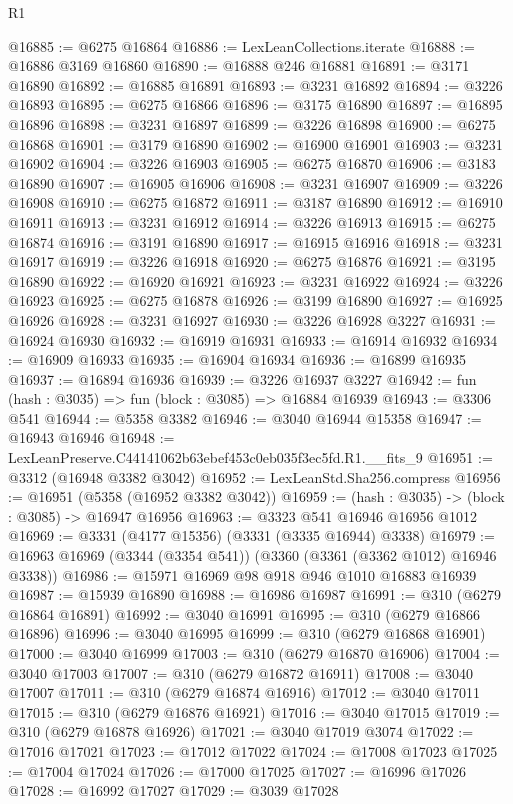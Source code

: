 \begin{lexlean}{R1}
\begin{coremodule}
@16885 := @6275 @16864
@16886 := LexLeanCollections.iterate
@16888 := @16886 @3169 @16860
@16890 := @16888 @246 @16881
@16891 := @3171 @16890
@16892 := @16885 @16891
@16893 := @3231 @16892
@16894 := @3226 @16893
@16895 := @6275 @16866
@16896 := @3175 @16890
@16897 := @16895 @16896
@16898 := @3231 @16897
@16899 := @3226 @16898
@16900 := @6275 @16868
@16901 := @3179 @16890
@16902 := @16900 @16901
@16903 := @3231 @16902
@16904 := @3226 @16903
@16905 := @6275 @16870
@16906 := @3183 @16890
@16907 := @16905 @16906
@16908 := @3231 @16907
@16909 := @3226 @16908
@16910 := @6275 @16872
@16911 := @3187 @16890
@16912 := @16910 @16911
@16913 := @3231 @16912
@16914 := @3226 @16913
@16915 := @6275 @16874
@16916 := @3191 @16890
@16917 := @16915 @16916
@16918 := @3231 @16917
@16919 := @3226 @16918
@16920 := @6275 @16876
@16921 := @3195 @16890
@16922 := @16920 @16921
@16923 := @3231 @16922
@16924 := @3226 @16923
@16925 := @6275 @16878
@16926 := @3199 @16890
@16927 := @16925 @16926
@16928 := @3231 @16927
@16930 := @3226 @16928 @3227
@16931 := @16924 @16930
@16932 := @16919 @16931
@16933 := @16914 @16932
@16934 := @16909 @16933
@16935 := @16904 @16934
@16936 := @16899 @16935
@16937 := @16894 @16936
@16939 := @3226 @16937 @3227
@16942 := fun (hash : @3035) => fun (block : @3085) => @16884 @16939
@16943 := @3306 @541
@16944 := @5358 @3382
@16946 := @3040 @16944 @15358
@16947 := @16943 @16946
@16948 := LexLeanPreserve.C44141062b63ebef453c0eb035f3ec5fd.R1.__fits_9
@16951 := @3312 (@16948 @3382 @3042)
@16952 := LexLeanStd.Sha256.compress
@16956 := @16951 (@5358 (@16952 @3382 @3042))
@16959 := (hash : @3035) -> (block : @3085) -> @16947 @16956
@16963 := @3323 @541 @16946 @16956 @1012
@16969 := @3331 (@4177 @15356) (@3331 (@3335 @16944) @3338)
@16979 := @16963 @16969 (@3344 (@3354 @541)) (@3360 (@3361 (@3362 @1012) @16946 @3338))
@16986 := @15971 @16969 @98 @918 @946 @1010 @16883 @16939
@16987 := @15939 @16890
@16988 := @16986 @16987
@16991 := @310 (@6279 @16864 @16891)
@16992 := @3040 @16991
@16995 := @310 (@6279 @16866 @16896)
@16996 := @3040 @16995
@16999 := @310 (@6279 @16868 @16901)
@17000 := @3040 @16999
@17003 := @310 (@6279 @16870 @16906)
@17004 := @3040 @17003
@17007 := @310 (@6279 @16872 @16911)
@17008 := @3040 @17007
@17011 := @310 (@6279 @16874 @16916)
@17012 := @3040 @17011
@17015 := @310 (@6279 @16876 @16921)
@17016 := @3040 @17015
@17019 := @310 (@6279 @16878 @16926)
@17021 := @3040 @17019 @3074
@17022 := @17016 @17021
@17023 := @17012 @17022
@17024 := @17008 @17023
@17025 := @17004 @17024
@17026 := @17000 @17025
@17027 := @16996 @17026
@17028 := @16992 @17027
@17029 := @3039 @17028

\end{coremodule}
\end{lexlean}
